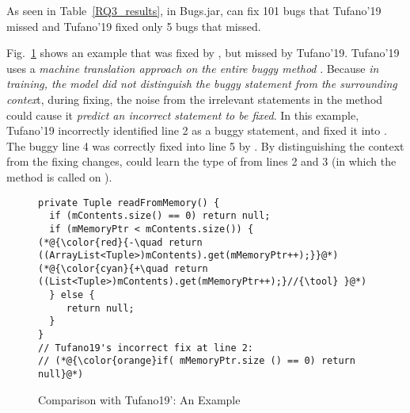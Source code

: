 As seen in Table~\ref{RQ3_results}, in Bugs.jar, {\tool} can fix 101
bugs that Tufano'19 missed and Tufano'19 fixed only 5 bugs
that {\tool} missed.

Fig.~\ref{example_tufano19} shows an example that was fixed by
{\tool}, but missed by Tufano'19. Tufano'19 uses a {\em
  machine translation approach on the entire buggy method}
.  Because {\em in training, the model did not
  distinguish the buggy statement from the surrounding contex}t,
during fixing, the noise from the irrelevant statements in the method
could cause it {\em predict an incorrect statement to be fixed}. In
this example, Tufano'19 incorrectly identified line 2 as a buggy
statement, and fixed it into  
\code{()} \code{==}   . The buggy
line 4 was correctly fixed into line 5 by {\tool}. By distinguishing
the context from the fixing changes, {\tool} could learn the type
 of  from lines 2 and 3 (in which the
method  is called on ).


\begin{figure}[t]
	\centering
	\begin{lstlisting}[]
private Tuple readFromMemory() {
  if (mContents.size() == 0) return null;
  if (mMemoryPtr < mContents.size()) {
(*@{\color{red}{-\quad return ((ArrayList<Tuple>)mContents).get(mMemoryPtr++);}}@*)
(*@{\color{cyan}{+\quad return ((List<Tuple>)mContents).get(mMemoryPtr++);}//{\tool} }@*)
  } else {
     return null;
  }
}
// Tufano19's incorrect fix at line 2:
// (*@{\color{orange}if( mMemoryPtr.size () == 0) return null}@*) 
	\end{lstlisting}
        \vspace{-15pt}
	\caption{Comparison with Tufano19': An Example}
	\label{example_tufano19}
\end{figure}

